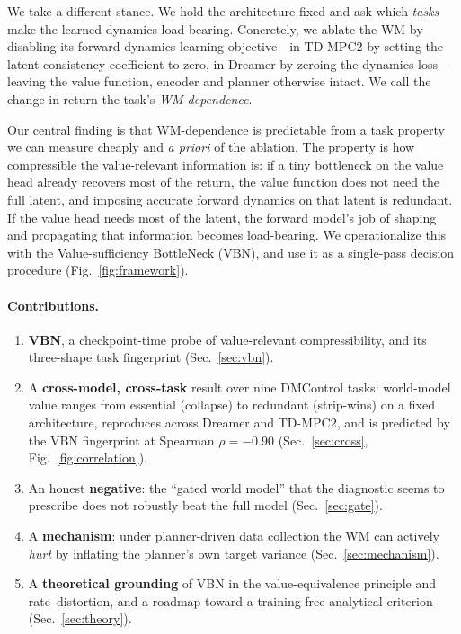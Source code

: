 \documentclass[twocolumn,10pt]{article}
\begin{document}
We take a different stance. We hold the architecture fixed and ask which
\emph{tasks} make the learned dynamics load-bearing. Concretely, we ablate
the WM by disabling its forward-dynamics learning objective---in TD-MPC2 by
setting the latent-consistency coefficient to zero, in Dreamer by zeroing the
dynamics loss---leaving the value function, encoder and planner otherwise
intact. We call the change in return the task's \emph{WM-dependence}.

Our central finding is that WM-dependence is predictable from a task property
we can measure cheaply and \emph{a priori} of the ablation. The property is
how compressible the value-relevant information is: if a tiny bottleneck on
the value head already recovers most of the return, the value function does
not need the full latent, and imposing accurate forward dynamics on that
latent is redundant. If the value head needs most of the latent, the forward
model's job of shaping and propagating that information becomes load-bearing.
We operationalize this with the Value-sufficiency BottleNeck (VBN), and use it
as a single-pass decision procedure (Fig.~\ref{fig:framework}).

\paragraph{Contributions.}
\begin{enumerate}\itemsep2pt
\item \textbf{VBN}, a checkpoint-time probe of value-relevant
compressibility, and its three-shape task fingerprint (Sec.~\ref{sec:vbn}).
\item A \textbf{cross-model, cross-task} result over nine DMControl tasks:
world-model value ranges from essential (collapse) to redundant (strip-wins)
on a fixed architecture, reproduces across Dreamer and TD-MPC2, and is
predicted by the VBN fingerprint at Spearman $\rho{=}{-}0.90$
(Sec.~\ref{sec:cross}, Fig.~\ref{fig:correlation}).
\item An honest \textbf{negative}: the ``gated world model'' that the
diagnostic seems to prescribe does not robustly beat the full model
(Sec.~\ref{sec:gate}).
\item A \textbf{mechanism}: under planner-driven data collection the WM can
actively \emph{hurt} by inflating the planner's own target variance
(Sec.~\ref{sec:mechanism}).
\item A \textbf{theoretical grounding} of VBN in the value-equivalence
principle and rate--distortion, and a roadmap toward a training-free
analytical criterion (Sec.~\ref{sec:theory}).
\end{enumerate}
\end{document}
